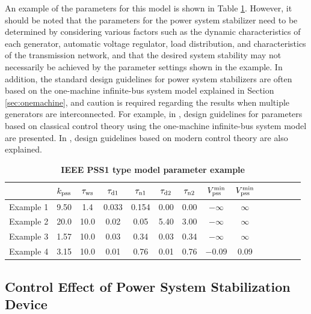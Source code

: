 \documentclass[graybox, envcountchap]{svmult}
\begin{document}
An example of the parameters for this model is shown in Table
\ref{table:psspara}. However, it should be noted that the parameters for the
power system stabilizer need to be determined by considering various factors
such as the dynamic characteristics of each generator, automatic voltage
regulator, load distribution, and characteristics of the transmission network,
and that the desired system stability may not necessarily be achieved by the
parameter settings shown in the example. In addition, the standard design
guidelines for power system stabilizers are often based on the one-machine
infinite-bus system model explained in Section \ref{sec:onemachine}, and caution
is required regarding the results when multiple generators are interconnected.
For example, in \cite[Section 12.5]{kundur1994power}, design guidelines for
parameters based on classical control theory using the one-machine infinite-bus
system model are presented.  In \cite{chow2004power}, design guidelines based on
modern control theory are also explained.

\begin{table}[ht]
\medskip
 \caption{\textbf{IEEE PSS1 type model parameter example}}
 \label{table:psspara}
 \centering
  \begin{tabular}{lccccccccccccc}
   \hline
 &  $k_{\rm pss}$ & $\tau_{\rm ws}$ & $\tau_{{\rm d}1}$ & $\tau_{{\rm n}1}$ & $\tau_{{\rm d}2}$ & $\tau_{{\rm n}2}$ & $V_{\rm pss}^{\rm min}$ & $V_{\rm pss}^{\rm min}$ \\
   \hline \hline
   Example 1 \cite[Section 12.5]{kundur1994power}& 9.50 & 1.4 & 0.033 & 0.154 & 0.00 & 0.00 & $-\infty$ & $\infty$ \\
   Example 2 \cite[Section 12.8]{kundur1994power}& 20.0 & 10.0 & 0.02 & 0.05 & 5.40 & 3.00 & $-\infty$ & $\infty$ \\
   Example 3 \cite[Section III]{chow2004power}& 1.57 & 10.0 & 0.03 & 0.34 & 0.03 & 0.34 & $-\infty$ & $\infty$ \\
   Example 4 \cite[Table H.3]{ieee2016ieee}& 3.15 & 10.0 & 0.01 & 0.76 & 0.01 & 0.76 & $-0.09$ & 0.09\\
   \hline
  \end{tabular}
\end{table}

\subsection{Control Effect of Power System Stabilization Device}\label{sec:pssov}
\end{document}
